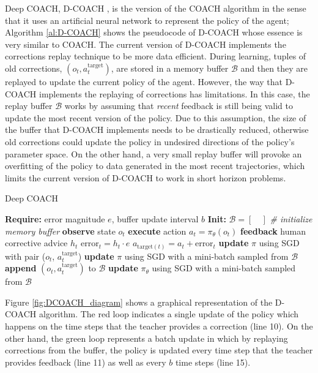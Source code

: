 Deep COACH, D-COACH \cite{ResearchAssignmentpaper}, is the  version of the COACH algorithm in the sense that it uses an artificial neural network to represent the policy of the agent; Algorithm \ref{al:D-COACH} shows the pseudocode of D-COACH whose essence is very similar to COACH. The current version of D-COACH implements the corrections replay technique to be more data efficient. During learning, tuples of old corrections, $(o_t, a^{\text{target}}_t)$, are stored in a memory buffer $\mathcal{B}$ and then they are replayed to update the current policy of the agent. However, the way that D-COACH implements the replaying of corrections has limitations. In this case, the replay buffer $\mathcal{B}$ works by assuming that \textit{recent} feedback is still being valid to update the most recent version of the policy. Due to this assumption, the size of the buffer that D-COACH implements needs to be drastically reduced, otherwise old corrections could update the policy in undesired directions of the policy’s parameter space. On the other hand, a very small replay buffer will provoke an  overfitting of the policy to data generated in the most recent trajectories, which limits the current version of D-COACH to work in short horizon problems.



\begin{algorithm}[H]
\caption{Deep COACH}\label{algorithm:DeepCOACH}
\begin{algorithmic}[1]
\State \textbf{Require:} error magnitude $e$, buffer update interval $b$
\State \textbf{Init:} $\mathcal{B} = [\quad]$  \emph{\# initialize memory buffer}
\State \textbf{observe} state $o_{t}$
\State \textbf{execute} action $a_{t}=\pi_{\theta}(o_{t})$
\State \textbf{feedback} human corrective advice $h_{t}$
\State $\text{error}_{t} = h_{t}\cdot e$
\State $a_{\text{target}(t)} = a_{t} + \text{error}_{t}$
\State \textbf{update} $\pi$ using SGD with pair ($o_{t}$, $a^{\text{target}}_{t}$)
\State \textbf{update} $\pi$ using SGD with a mini-batch sampled from $\mathcal{B}$
\State \textbf{append} $(o_{t}, a^{\text{target}}_{t})$ to $\mathcal{B}$
\EndIf
{}
\State \textbf{update} $\pi_{\theta}$ using SGD with a mini-batch sampled from $\mathcal{B}$
\EndIf
\EndFor
\end{algorithmic}
\label{al:D-COACH}
\end{algorithm}


Figure \ref{fig:DCOACH_diagram} shows a graphical representation of the D-COACH algorithm. The red loop indicates a single update of the policy which happens on the time steps that the teacher provides a correction (line 10). On the other hand, the green loop represents a batch update in which by replaying corrections from the buffer, the policy is updated every time step that the teacher provides feedback (line 11) as well as every $b$ time steps (line 15).

